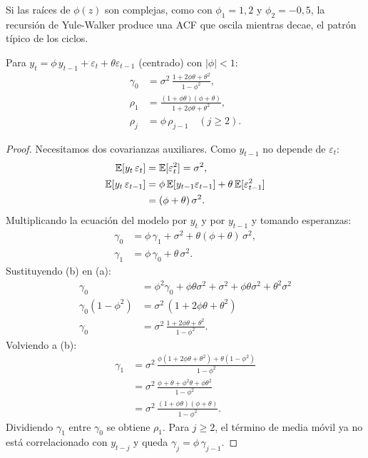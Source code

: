 Si las raíces de $\phi(z)$ son complejas, como con $\phi_1=1{,}2$ y $\phi_2=-0{,}5$, la recursión de
Yule-Walker produce una ACF que oscila mientras decae, el patrón típico de los ciclos.

\begin{proposicion}\label{prop:arma11}
Para $y_t=\phi\,y_{t-1}+\varepsilon_t+\theta\varepsilon_{t-1}$ (centrado) con $|\phi|<1$:
\begin{align*}
  \gamma_0 &= \sigma^2\,\frac{1+2\phi\theta+\theta^2}{1-\phi^2},\\
  \rho_1   &= \frac{(1+\phi\theta)(\phi+\theta)}{1+2\phi\theta+\theta^2},\\
  \rho_j   &= \phi\,\rho_{j-1} \quad (j\ge2).
\end{align*}
\end{proposicion}

\begin{proof}
Necesitamos dos covarianzas auxiliares. Como $y_{t-1}$ no depende de $\varepsilon_t$:
\begin{align*}
  \mathbb{E}[y_t\,\varepsilon_t]     &= \mathbb{E}[\varepsilon_t^2] = \sigma^2,\\
  \mathbb{E}[y_t\,\varepsilon_{t-1}] &= \phi\,\mathbb{E}[y_{t-1}\varepsilon_{t-1}]+\theta\,\mathbb{E}[\varepsilon_{t-1}^2]\\
                             &= (\phi+\theta)\,\sigma^2 .
\end{align*}
Multiplicando la ecuación del modelo por $y_t$ y por $y_{t-1}$ y tomando esperanzas:
\begin{align*}
  \gamma_0 &= \phi\,\gamma_1+\sigma^2+\theta(\phi+\theta)\,\sigma^2, \tag{a}\\
  \gamma_1 &= \phi\,\gamma_0+\theta\,\sigma^2 . \tag{b}
\end{align*}
Sustituyendo (b) en (a):
\begin{align*}
  \gamma_0           &= \phi^2\gamma_0+\phi\theta\sigma^2+\sigma^2+\phi\theta\sigma^2+\theta^2\sigma^2\\
  \gamma_0(1-\phi^2) &= \sigma^2\,(1+2\phi\theta+\theta^2)\\
  \gamma_0           &= \sigma^2\,\frac{1+2\phi\theta+\theta^2}{1-\phi^2}.
\end{align*}
Volviendo a (b):
\begin{align*}
  \gamma_1 &= \sigma^2\,\frac{\phi(1+2\phi\theta+\theta^2)+\theta(1-\phi^2)}{1-\phi^2}\\
           &= \sigma^2\,\frac{\phi+\theta+\phi^2\theta+\phi\theta^2}{1-\phi^2}\\
           &= \sigma^2\,\frac{(1+\phi\theta)(\phi+\theta)}{1-\phi^2}.
\end{align*}
Dividiendo $\gamma_1$ entre $\gamma_0$ se obtiene $\rho_1$. Para $j\ge2$, el término de media móvil ya no
está correlacionado con $y_{t-j}$ y queda $\gamma_j=\phi\,\gamma_{j-1}$.
\end{proof}

